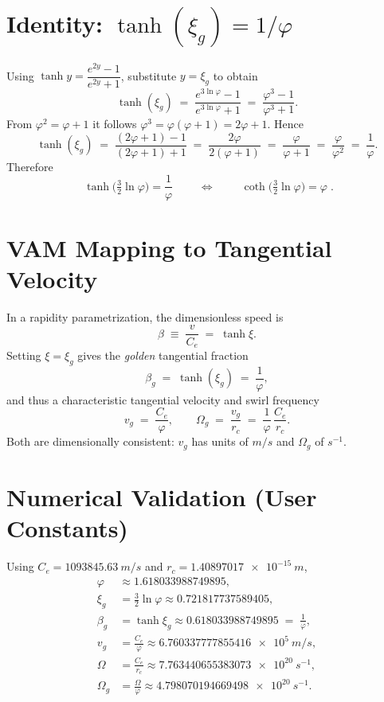 \documentclass[11pt]{article}
\begin{document}
\section*{Identity: \(\tanh(\xi_g)=1/\varphi\)}
Using $\tanh y = \dfrac{e^{2y}-1}{e^{2y}+1}$, substitute $y=\xi_g$ to obtain
\begin{equation}
  \tanh(\xi_g) \;=\; \frac{e^{3\ln\varphi}-1}{e^{3\ln\varphi}+1}
  \;=\; \frac{\varphi^3-1}{\varphi^3+1}.
\end{equation}
From $\varphi^2=\varphi+1$ it follows $\varphi^3=\varphi(\varphi+1)=2\varphi+1$. Hence
\begin{equation}
  \tanh(\xi_g) \;=\; \frac{(2\varphi+1)-1}{(2\varphi+1)+1}
  \;=\; \frac{2\varphi}{2(\varphi+1)}
  \;=\; \frac{\varphi}{\varphi+1}
  \;=\; \frac{\varphi}{\varphi^2}
  \;=\; \frac{1}{\varphi}.
\end{equation}
Therefore
\begin{equation}
  \boxed{\;\tanh\!\big(\tfrac{3}{2}\ln\varphi\big)=\frac{1}{\varphi}\;}
  \qquad\Longleftrightarrow\qquad
  \boxed{\;\coth\!\big(\tfrac{3}{2}\ln\varphi\big)=\varphi\; }.
\end{equation}

\section*{VAM Mapping to Tangential Velocity}
In a rapidity parametrization, the dimensionless speed is
\begin{equation}
  \beta \;\equiv\; \frac{v}{C_e} \;=\; \tanh \xi.
\end{equation}
Setting $\xi=\xi_g$ gives the \emph{golden} tangential fraction
\begin{equation}
  \beta_g \;=\; \tanh(\xi_g) \;=\; \frac{1}{\varphi},
\end{equation}
and thus a characteristic tangential velocity and swirl frequency
\begin{equation}
  v_g \;=\; \frac{C_e}{\varphi}, \qquad
  \Omega_g \;=\; \frac{v_g}{r_c} \;=\; \frac{1}{\varphi}\,\frac{C_e}{r_c}.
\end{equation}
Both are dimensionally consistent: $v_g$ has units of \(\si{m/s}\) and $\Omega_g$ of \(\si{s^{-1}}\).

\section*{Numerical Validation (User Constants)}
Using $C_e=\SI{1093845.63}{m/s}$ and $r_c=\SI{1.40897017e-15}{m}$,
\begin{align}
  \varphi &\approx 1.618033988749895,\\
  \xi_g &= \tfrac{3}{2}\ln\varphi \approx 0.721817737589405,\\
  \beta_g &= \tanh\xi_g \approx 0.618033988749895 \;=\; \frac{1}{\varphi},\\
  v_g &= \frac{C_e}{\varphi} \approx \SI{6.760337777855416e5}{m/s},\\
  \Omega &= \frac{C_e}{r_c} \approx \SI{7.763440655383073e20}{s^{-1}},\\
  \Omega_g &= \frac{\Omega}{\varphi} \approx \SI{4.798070194669498e20}{s^{-1}}.
\end{align}
\end{document}
